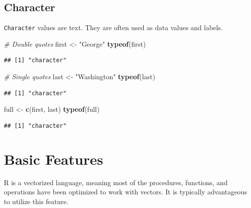 \documentclass[
]{book}
\newenvironment{Shaded}{\begin{snugshade}}{\end{snugshade}}
\newcommand{\CommentTok}[1]{\textcolor[rgb]{0.56,0.35,0.01}{\textit{#1}}}
\newcommand{\KeywordTok}[1]{\textcolor[rgb]{0.13,0.29,0.53}{\textbf{#1}}}
\newcommand{\NormalTok}[1]{#1}
\newcommand{\StringTok}[1]{\textcolor[rgb]{0.31,0.60,0.02}{#1}}
\begin{document}
\hypertarget{character}{%
\subsection*{Character}\label{character}}

\texttt{Character} values are text. They are often used as data values and labels.

\begin{Shaded}
\begin{Highlighting}[]
\CommentTok{# Double quotes}
\NormalTok{first <-}\StringTok{ "George"}
\KeywordTok{typeof}\NormalTok{(first)}
\end{Highlighting}
\end{Shaded}

\begin{verbatim}
## [1] "character"
\end{verbatim}

\begin{Shaded}
\begin{Highlighting}[]
\CommentTok{# Single quotes}
\NormalTok{last <-}\StringTok{ "Washington"}
\KeywordTok{typeof}\NormalTok{(last)}
\end{Highlighting}
\end{Shaded}

\begin{verbatim}
## [1] "character"
\end{verbatim}

\begin{Shaded}
\begin{Highlighting}[]
\NormalTok{full <-}\StringTok{ }\KeywordTok{c}\NormalTok{(first, last)}
\KeywordTok{typeof}\NormalTok{(full)}
\end{Highlighting}
\end{Shaded}

\begin{verbatim}
## [1] "character"
\end{verbatim}

\hypertarget{basic-features}{%
\section{Basic Features}\label{basic-features}}

R is a vectorized language, meaning most of the procedures, functions, and operations have been optimized to work with vectors. It is typically advantageous to utilize this feature.
\end{document}
